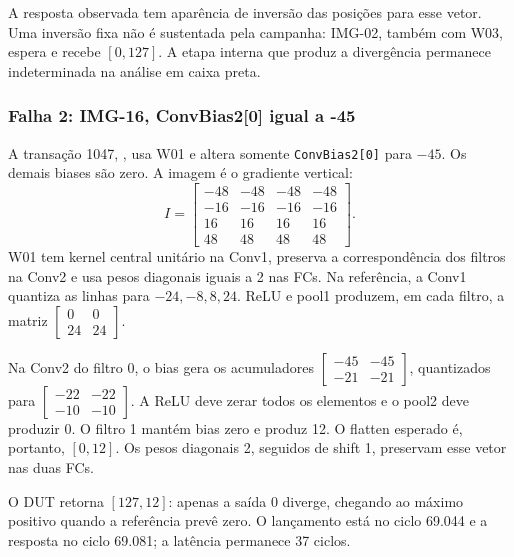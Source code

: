 \documentclass[12pt,a4paper]{article}
\newcommand{\arquivo}[1]{\texttt{\detokenize{#1}}}
\begin{document}
A resposta observada tem aparência de inversão das posições para esse vetor. Uma inversão fixa não é sustentada pela campanha: IMG-02, também com W03, espera e recebe $[0,127]$. A etapa interna que produz a divergência permanece indeterminada na análise em caixa preta.

\subsubsection{Falha 2: IMG-16, ConvBias2[0] igual a -45}
A transação 1047, \arquivo{bias_group_1_value_-45}, usa W01 e altera somente \texttt{ConvBias2[0]} para $-45$. Os demais biases são zero. A imagem é o gradiente vertical:
\[
I=\begin{bmatrix}
-48&-48&-48&-48\\-16&-16&-16&-16\\16&16&16&16\\48&48&48&48
\end{bmatrix}.
\]
W01 tem kernel central unitário na Conv1, preserva a correspondência dos filtros na Conv2 e usa pesos diagonais iguais a 2 nas FCs. Na referência, a Conv1 quantiza as linhas para $-24,-8,8,24$. ReLU e pool1 produzem, em cada filtro, a matriz $\begin{bmatrix}0&0\\24&24\end{bmatrix}$.

Na Conv2 do filtro 0, o bias gera os acumuladores
$\begin{bmatrix}-45&-45\\-21&-21\end{bmatrix}$,
quantizados para $\begin{bmatrix}-22&-22\\-10&-10\end{bmatrix}$.
A ReLU deve zerar todos os elementos e o pool2 deve produzir 0. O filtro 1 mantém bias zero e produz 12. O flatten esperado é, portanto, $[0,12]$. Os pesos diagonais 2, seguidos de shift 1, preservam esse vetor nas duas FCs.

O DUT retorna $[127,12]$: apenas a saída 0 diverge, chegando ao máximo positivo quando a referência prevê zero. O lançamento está no ciclo 69.044 e a resposta no ciclo 69.081; a latência permanece 37 ciclos.
\end{document}
